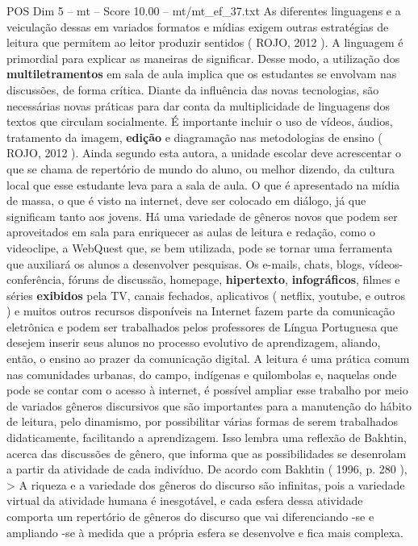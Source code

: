 \begin{textsample}{POS Dim 5 – mt – Score 10.00 – mt/mt\_ef\_37.txt}
As diferentes linguagens e a veiculação dessas em variados formatos e mídias exigem outras estratégias de leitura que permitem ao leitor produzir sentidos ( ROJO, 2012 ).
A linguagem é primordial para explicar as maneiras de significar.
Desse modo, a utilização dos \textbf{multiletramentos} em sala de aula implica que os estudantes se envolvam nas discussões, de forma crítica.
Diante da influência das novas tecnologias, são necessárias novas práticas para dar conta da multiplicidade de linguagens dos textos que circulam socialmente.
É importante incluir o uso de vídeos, áudios, tratamento da imagem, \textbf{edição} e diagramação nas metodologias de ensino ( ROJO, 2012 ).
Ainda segundo esta autora, a unidade escolar deve acrescentar o que se chama de repertório de mundo do aluno, ou melhor dizendo, da cultura local que esse estudante leva para a sala de aula.
O que é apresentado na mídia de massa, o que é visto na internet, deve ser colocado em diálogo, já que significam tanto aos jovens.
Há uma variedade de gêneros novos que podem ser aproveitados em sala para enriquecer as aulas de leitura e redação, como o videoclipe, a WebQuest que, se bem utilizada, pode se tornar uma ferramenta que auxiliará os alunos a desenvolver pesquisas.
Os e-mails, chats, blogs, vídeos-conferência, fóruns de discussão, homepage, \textbf{hipertexto}, \textbf{infográficos}, filmes e séries \textbf{exibidos} pela TV, canais fechados, aplicativos ( netflix, youtube, e outros ) e muitos outros recursos disponíveis na Internet fazem parte da comunicação eletrônica e podem ser trabalhados pelos professores de Língua Portuguesa que desejem inserir seus alunos no processo evolutivo de aprendizagem, aliando, então, o ensino ao prazer da comunicação digital.
A leitura é uma prática comum nas comunidades urbanas, do campo, indígenas e quilombolas e, naquelas onde pode se contar com o acesso à internet, é possível ampliar esse trabalho por meio de variados gêneros discursivos que são importantes para a manutenção do hábito de leitura, pelo dinamismo, por possibilitar várias formas de serem trabalhados didaticamente, facilitando a aprendizagem.
Isso lembra uma reflexão de Bakhtin, acerca das discussões de gênero, que informa que as possibilidades se desenrolam a partir da atividade de cada indivíduo.
De acordo com Bakhtin ( 1996, p. 280 ), > A riqueza e a variedade dos gêneros do discurso são infinitas, pois a variedade virtual da atividade humana é inesgotável, e cada esfera dessa atividade comporta um repertório de gêneros do discurso que vai diferenciando -se e ampliando -se à medida que a própria esfera se desenvolve e fica mais complexa.

\end{textsample}
